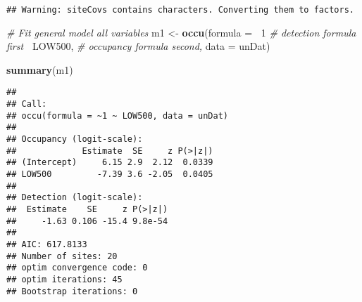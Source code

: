 \documentclass[]{book}
\newenvironment{Shaded}{\begin{snugshade}}{\end{snugshade}}
\newcommand{\KeywordTok}[1]{\textcolor[rgb]{0.13,0.29,0.53}{\textbf{#1}}}
\newcommand{\DataTypeTok}[1]{\textcolor[rgb]{0.13,0.29,0.53}{#1}}
\newcommand{\DecValTok}[1]{\textcolor[rgb]{0.00,0.00,0.81}{#1}}
\newcommand{\StringTok}[1]{\textcolor[rgb]{0.31,0.60,0.02}{#1}}
\newcommand{\CommentTok}[1]{\textcolor[rgb]{0.56,0.35,0.01}{\textit{#1}}}
\newcommand{\OperatorTok}[1]{\textcolor[rgb]{0.81,0.36,0.00}{\textbf{#1}}}
\newcommand{\NormalTok}[1]{#1}
\begin{document}
\begin{verbatim}
## Warning: siteCovs contains characters. Converting them to factors.
\end{verbatim}

\begin{Shaded}
\begin{Highlighting}[]
\CommentTok{# Fit general model all variables}
\NormalTok{m1 <-}\StringTok{ }\KeywordTok{occu}\NormalTok{(}\DataTypeTok{formula =} \OperatorTok{~}\DecValTok{1} \CommentTok{# detection formula first}
                     \OperatorTok{~}\NormalTok{LOW500, }\CommentTok{# occupancy formula second,}
                \DataTypeTok{data =}\NormalTok{ unDat)}
\end{Highlighting}
\end{Shaded}

\begin{Shaded}
\begin{Highlighting}[]
\KeywordTok{summary}\NormalTok{(m1)}
\end{Highlighting}
\end{Shaded}

\begin{verbatim}
## 
## Call:
## occu(formula = ~1 ~ LOW500, data = unDat)
## 
## Occupancy (logit-scale):
##             Estimate  SE     z P(>|z|)
## (Intercept)     6.15 2.9  2.12  0.0339
## LOW500         -7.39 3.6 -2.05  0.0405
## 
## Detection (logit-scale):
##  Estimate    SE     z P(>|z|)
##     -1.63 0.106 -15.4 9.8e-54
## 
## AIC: 617.8133 
## Number of sites: 20
## optim convergence code: 0
## optim iterations: 45 
## Bootstrap iterations: 0
\end{verbatim}
\end{document}
